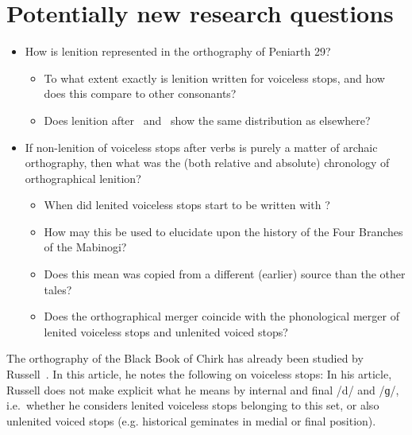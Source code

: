  \section{Potentially new research questions}
 \begin{itemize}
 \item How is lenition represented in the orthography of Peniarth 29?
 \begin{itemize}
 \item To what extent exactly is lenition written for voiceless stops, and how does this compare to other consonants?
 \item Does lenition after \ei\ and \oes\ show the same distribution as elsewhere?
 \end{itemize}
 \item If non-lenition of voiceless stops after verbs is purely a matter of archaic orthography, then what was the (both relative and absolute) chronology of orthographical lenition?
 \begin{itemize}
 \item When did lenited voiceless stops start to be written with ?
 \item How may this be used to elucidate upon the history of the Four Branches of the Mabinogi? \item Does this mean  was copied from a different (earlier) source than the other tales? 
 \item Does the orthographical merger coincide with the phonological merger of lenited voiceless stops and unlenited voiced stops?
 \end{itemize}
\end{itemize}



 The orthography of the Black Book of Chirk has already been studied by Russell~\parencite*{Rus_Scribal95}. In this article, he notes the following on voiceless stops:  In his article, Russell does not make explicit what he means by internal and final /d/ and /ɡ/, i.e.\ whether he considers lenited voiceless stops belonging to this set, or also unlenited voiced stops (e.g. historical geminates in medial or final position).

